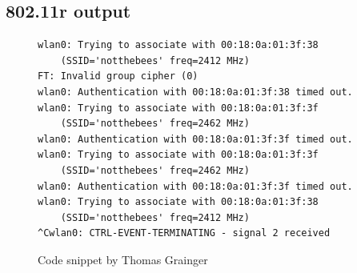 \documentclass[12pt,a4paper,titlepage]{article}
\begin{document}
\subsection{802.11r output}
\label{sec:testing-output;sub:80211r}
\begin{figure}[h!]
\begin{Verbatim}[frame=single]
wlan0: Trying to associate with 00:18:0a:01:3f:38
	(SSID='notthebees' freq=2412 MHz)
FT: Invalid group cipher (0)
wlan0: Authentication with 00:18:0a:01:3f:38 timed out.
wlan0: Trying to associate with 00:18:0a:01:3f:3f
	(SSID='notthebees' freq=2462 MHz)
wlan0: Authentication with 00:18:0a:01:3f:3f timed out.
wlan0: Trying to associate with 00:18:0a:01:3f:3f
	(SSID='notthebees' freq=2462 MHz)
wlan0: Authentication with 00:18:0a:01:3f:3f timed out.
wlan0: Trying to associate with 00:18:0a:01:3f:38
	(SSID='notthebees' freq=2412 MHz)
^Cwlan0: CTRL-EVENT-TERMINATING - signal 2 received
\end{Verbatim}
\caption{Code snippet by Thomas Grainger}
\end{figure}
\end{document}

